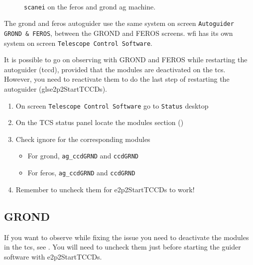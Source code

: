 \documentclass[11pt,fleqn,a4paper]{book}
\begin{document}
\begin{figure}[p!]
\begin{minipage}{0.48\linewidth}
\\
\end{minipage}
\hspace{0.02\linewidth}
\begin{minipage}{0.48\linewidth}
\end{minipage}
\caption[Command scanei to control \glspl{environment}]{\texttt{scanei} on the \gls{feros} and \gls{grond} 
\gls{ag} machine.}
\label{fig:agscanei}
\end{figure}


The \gls{grond} and \gls{feros} autoguider use the same system on screen \texttt{Autoguider GROND \& FEROS}, between the GROND and FEROS screens.  \gls{wfi} has its own system on screen \texttt{Telescope Control Software}.

It is possible to go on observing with GROND and FEROS while restarting the autoguider (\acrlong{tccd}), provided that the modules are deactivated on the \gls{tcs}. However, you need to reactivate them to do the last step of restarting the autoguider (gls{e2p2StartTCCDs}).

\label{proc:agmodules}
\begin{enumerate}
    \item On screen \texttt{Telescope Control Software} go to \texttt{Status} \gls{desktop}
    \item On the \gls{TCS status panel} locate the modules section ()
    \item Check ignore for the corresponding modules
    \begin{itemize}
        \item For \gls{grond}, \texttt{ag\_ccdGRND} and \texttt{ccdGRND}
        \item For \gls{feros}, \texttt{ag\_ccdGRND} and \texttt{ccdGRND}
    \end{itemize}
    \item Remember to uncheck them for \gls{e2p2StartTCCDs} to work!
\end{enumerate}

\subsection{GROND}
If you want to observe while fixing the issue you need to deactivate the modules in the \gls{tcs}, see .  You will need to uncheck them just before starting the guider software with \gls{e2p2StartTCCDs}.
\end{document}
